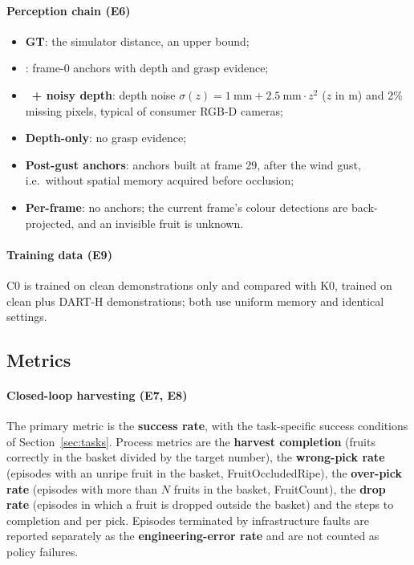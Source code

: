 \paragraph{Perception chain (E6)}
\begin{itemize}
\item \textbf{GT}: the simulator distance, an upper bound;
\item \textbf{\fdm}: frame-0 anchors with depth and grasp evidence;
\item \textbf{\fdm\ + noisy depth}: depth noise $\sigma(z) = 1~\mathrm{mm} + 2.5~\mathrm{mm}\cdot z^2$ ($z$ in m) and 2\% missing pixels, typical of consumer RGB-D cameras;
\item \textbf{Depth-only}: no grasp evidence;
\item \textbf{Post-gust anchors}: anchors built at frame 29, after the wind gust, i.e.\ without spatial memory acquired before occlusion;
\item \textbf{Per-frame}: no anchors; the current frame's colour detections are back-projected, and an invisible fruit is unknown.
\end{itemize}

\paragraph{Training data (E9)} C0 is trained on clean demonstrations only and compared with K0, trained on clean plus DART-H demonstrations; both use uniform memory and identical settings.

\subsection{Metrics}
\label{sec:metrics}
\paragraph{Closed-loop harvesting (E7, E8)} The primary metric is the \textbf{success rate}, with the task-specific success conditions of Section~\ref{sec:tasks}. Process metrics are the \textbf{harvest completion} (fruits correctly in the basket divided by the target number), the \textbf{wrong-pick rate} (episodes with an unripe fruit in the basket, FruitOccludedRipe), the \textbf{over-pick rate} (episodes with more than $N$ fruits in the basket, FruitCount), the \textbf{drop rate} (episodes in which a fruit is dropped outside the basket) and the steps to completion and per pick. Episodes terminated by infrastructure faults are reported separately as the \textbf{engineering-error rate} and are not counted as policy failures.

